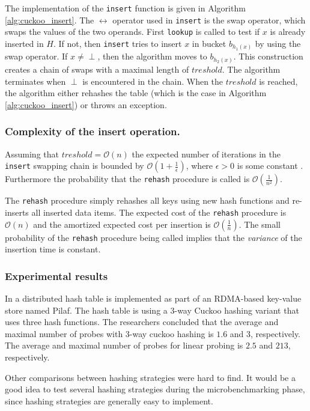 The implementation of the \texttt{insert} function is given in Algorithm \ref{alg:cuckoo_insert}. The $\leftrightarrow$ operator used in \texttt{insert} is the swap operator, which swaps the values of the two operands. First \texttt{lookup} is called to test if $x$ is already inserted in $H$. If not, then \texttt{insert} tries to insert $x$ in bucket $b_{h_1(x)}$ by using the swap operator. If $x \not = \perp$, then the algorithm moves to $b_{h_2(x)}$. This construction creates a chain of swaps with a maximal length of $treshold$. The algorithm terminates when $\perp$ is encountered in the chain. When the $treshold$ is reached, the algorithm either rehashes the table (which is the case in Algorithm \ref{alg:cuckoo_insert}) or throws an exception.

\subsubsection{Complexity of the insert operation.}
Assuming that $treshold = \mathcal{O}(n)$ the expected number of iterations in the \texttt{insert} swapping chain is bounded by $\mathcal{O}(1 + \frac{1}{\epsilon})$, where $\epsilon > 0$ is some constant \cite{Pagh:2004:CH:1006424.1006426}. Furthermore the probability that the \texttt{rehash} procedure is called is $\mathcal{O}(\frac{1}{n^2})$.

The \texttt{rehash} procedure simply rehashes all keys using new hash functions and re-inserts all inserted data items. The expected cost of the \texttt{rehash} procedure is $\mathcal{O}(n)$ and the amortized expected cost per insertion is $\mathcal{O}(\frac{1}{n})$. The small probability of the \texttt{rehash} procedure being called implies that the \emph{variance} of the insertion time is constant.

\subsubsection{Experimental results}
In \cite{pilaf} a distributed hash table is implemented as part of an RDMA-based key-value store named Pilaf. The hash table is using a 3-way Cuckoo hashing variant that uses three hash functions. The researchers concluded that the average and maximal number of probes with 3-way cuckoo hashing is $1.6$ and $3$, respectively. The average and maximal number of probes for linear probing is $2.5$ and $213$, respectively. 

Other comparisons between hashing strategies were hard to find. It would be a good idea to test several hashing strategies during the microbenchmarking phase, since hashing strategies are generally easy to implement. 

